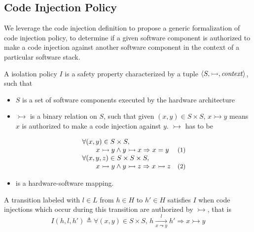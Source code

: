 \subsection{Code Injection Policy}
\label{subsec:speccert:globalsec}

We leverage the code injection definition to propose a generic formalization of
code injection policy, to determine if a given software component is authorized
to make a code injection against another software component in the context of a
particular software stack.

\begin{definition}
  \label{def:speccert:global}

  A isolation policy \( I \) is a safety property characterized by a tuple
  \( \langle S, \rightarrowtail, \mathit{context} \rangle \), such that
  \begin{itemize}
  \item \( S \) is a set of software components executed by the hardware
    architecture
  \item \( \rightarrowtail \) is a binary relation on \( S \), such that given
    \( (x, y) \in S \times S \), \( x \rightarrowtail y \) means \( x \) is
    authorized to make a code injection against \( y \).
    \( \rightarrowtail \) has to be
    \[
      \begin{array}{lr}
        \forall (x, y) \in S \times S,
        & \\
        \qquad x \rightarrowtail y \wedge y
        \rightarrowtail x \Rightarrow x = y
        & \text{\small (1)} \\
        \forall (x, y, z) \in S \times S \times S,
        & \\
        \qquad x \rightarrowtail y \wedge y
        \rightarrowtail z \Rightarrow x \rightarrowtail z
        & \text{\small (2)}
      \end{array}
    \]
  \item {} is a hardware-software mapping.
  \end{itemize}

  A transition labeled with \( l \in L \) from \( h \in H \) to \( h' \in H \)
  satisfies \( I \) when code injections which occur during this transition are
  authorized by \( \rightarrowtail \), that is
  \[
    I(h, l, h') \triangleq \forall (x, y) \in S \times S \text{, } h
    \xrightarrow[x \leadsto y]{l} h' \Rightarrow x \rightarrowtail y
  \]
\end{definition}

